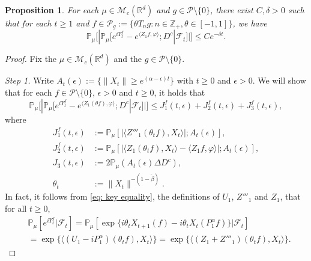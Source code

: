 \documentclass[12pt,a4paper]{amsart}
\theoremstyle{plain}
\newtheorem{prop}[thm]{Proposition}
\theoremstyle{definition}
\numberwithin{equation}{section}
\begin{document}
\begin{prop}
  \label{thm:Key}
  For each $\mu \in \mathcal M_c(\mathbb R^d)$ and $g \in \mathcal P \setminus \{0\}$, there exist $C,\delta>0$ such that
    for each $t\geq 1$ and $f \in \mathcal P_g:= \{\theta T_ng:n \in \mathbb Z_+, \theta \in [-1,1]\}$, we have
    \[
      \mathbb P_\mu
      \Big[  |\mathbb P_\mu [e^{i\Upsilon^f_t} - e^{\langle Z_1f, \varphi\rangle}; D^c | \mathscr F_t ]  |\Big]
      \leq C e^{- \delta t}.
    \]
\end{prop}
\begin{proof}
  Fix the $\mu \in \mathcal M_c(\mathbb R^d)$ and the $g \in \mathcal P\setminus \{0\}$.

  \emph{Step 1.} Write $ A_t(\epsilon) :=\{ \|X_t\| \geq e^{(\alpha - \epsilon)t} \} $ with $t\geq 0$ and $\epsilon > 0$.
  We will show that for each $f\in \mathcal P \setminus \{0\}$, $\epsilon > 0$ and $t\geq 0$, it holds that
  \[
    \mathbb P_\mu \Big[ | \mathbb P_\mu [e^{i\Upsilon^f_t} - e^{\langle Z_1(\theta f), \varphi\rangle}; D^c | \mathscr F_t ]| \Big]
    \leq J^f_1(t,\epsilon)+J^f_2(t,\epsilon)+J^f_3(t,\epsilon),
  \]
where
\begin{align}
\label{eq: Def of Ji}
  J^f_1(t,\epsilon)
  & := \mathbb{P}_{\mu} [ |\langle Z'''_1(\theta_t f), X_t\rangle |; A_t(\epsilon) ],
  \\ J^f_2(t,\epsilon)
  & := \mathbb{P}_{\mu}[|\langle Z_1(\theta_t f),X_t \rangle-\langle Z_1f, \varphi\rangle |; A_t(\epsilon)],
  \\ J_3(t,\epsilon)
  & :=2\mathbb{P}_{\mu}(A_t (\epsilon)\Delta D^c),
  \\ \theta_t
  & := \|X_t\|^{-(1 - \tilde \beta)}.
\end{align}
In fact, it follows from \eqref{eq: key equality}, the definitions of $U_1$, $Z'''_1$ and $Z_1$, that for all $t\geq 0$,
\begin{align}
  \label{eq: need1}
  & \mathbb{P}_{\mu}[e^{i\Upsilon^f_t}|\mathscr{F}_t]
    = \mathbb{P}_{\mu}[\exp\{i\theta_t X_{t+1} (f) - i \theta_t X_t(P_1^\alpha f)\} |\mathscr{F}_{t}] \\
  & = \exp\{\langle (U_1 - iP^\alpha_1 ) (\theta_t f),X_t\rangle\}
    = \exp\{\langle (Z_1 + Z'''_1) (\theta_t f),X_t\rangle\}.
\end{align}

\end{proof}
\end{document}

